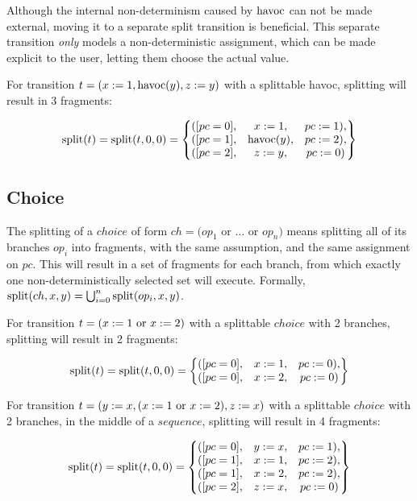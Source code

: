 Although the internal non-determinism caused by $\mathrm{havoc}$ can not be made external, moving it to a separate split transition is beneficial. This separate transition \textit{only} models a non-deterministic assignment, which can be made explicit to the user, letting them choose the actual value.

\begin{example} For transition $t = (x := 1, \mathrm{havoc}(y), z := y)$ with a splittable havoc, splitting will result in 3 fragments:

\begin{align*}
\mathrm{split}(t) = \mathrm{split}(t,0,0) = \begin{Bmatrix}
([pc = 0], & x := 1, & pc := 1), \\
([pc = 1], & \mathrm{havoc}(y), & pc := 2), \\
([pc = 2], & z := y, & pc := 0)
\end{Bmatrix}
\end{align*}
\end{example}

\subsection{Choice}
The splitting of a $choice$ of form $ch = (op_1$ or $\ldots$ or $op_n)$ means splitting all of its branches $op_i$ into fragments, with the same assumption, and the same assignment on $pc$. This will result in a set of fragments for each branch, from which exactly one non-deterministically selected set will execute. Formally, $\mathrm{split}(ch, x, y) = \bigcup_{i=0}^{n} \mathrm{split}(op_i, x, y)$.

\begin{example} For transition $t = (x := 1 \textup{ or } x := 2)$ with a splittable $choice$ with 2 branches, splitting will result in 2 fragments:

\begin{align*}
\mathrm{split}(t) = \mathrm{split}(t,0,0) = \begin{Bmatrix}
([pc = 0], & x:= 1, & pc := 0), \\
([pc = 0], & x := 2, & pc := 0)
\end{Bmatrix}
\end{align*}
\end{example}

\begin{example} For transition $t = (y := x, (x := 1 \textup{ or } x := 2), z := x)$ with a splittable $choice$ with 2 branches, in the middle of a $sequence$, splitting will result in 4 fragments:

\begin{align*}\mathrm{split}(t) = \mathrm{split}(t,0,0) = \begin{Bmatrix}
([pc = 0], & y := x, & pc := 1), \\
([pc = 1], & x:= 1, & pc := 2), \\
([pc = 1], & x := 2, & pc := 2), \\
([pc = 2], & z := x, & pc := 0)
\end{Bmatrix}
\end{align*}
\end{example}

